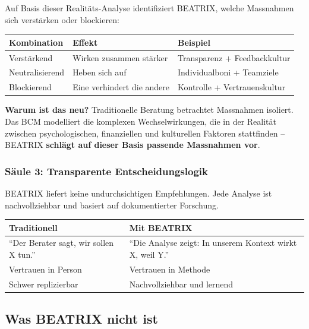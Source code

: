 \documentclass[11pt,a4paper]{article}
\begin{document}
Auf Basis dieser Realitäts-Analyse identifiziert BEATRIX, welche Massnahmen sich verstärken oder blockieren:

\begin{table}[h]
\centering
\begin{tabular}{@{}L{3cm}L{4cm}L{6cm}@{}}
\toprule
\textbf{Kombination} & \textbf{Effekt} & \textbf{Beispiel} \\
\midrule
Verstärkend & Wirken zusammen stärker & Transparenz + Feedbackkultur \\
Neutralisierend & Heben sich auf & Individualboni + Teamziele \\
Blockierend & Eine verhindert die andere & Kontrolle + Vertrauenskultur \\
\bottomrule
\end{tabular}
\end{table}

\textbf{Warum ist das neu?} Traditionelle Beratung betrachtet Massnahmen isoliert. Das BCM modelliert die komplexen Wechselwirkungen, die in der Realität zwischen psychologischen, finanziellen und kulturellen Faktoren stattfinden -- BEATRIX \textbf{schlägt auf dieser Basis passende Massnahmen vor}.

\subsubsection{Säule 3: Transparente Entscheidungslogik}

BEATRIX liefert keine undurchsichtigen Empfehlungen. Jede Analyse ist nachvollziehbar und basiert auf dokumentierter Forschung.

\begin{table}[h]
\centering
\begin{tabular}{@{}L{6cm}L{7cm}@{}}
\toprule
\textbf{Traditionell} & \textbf{Mit BEATRIX} \\
\midrule
``Der Berater sagt, wir sollen X tun.'' & ``Die Analyse zeigt: In unserem Kontext wirkt X, weil Y.'' \\
Vertrauen in Person & Vertrauen in Methode \\
Schwer replizierbar & Nachvollziehbar und lernend \\
\bottomrule
\end{tabular}
\end{table}

\subsection{Was BEATRIX nicht ist}
\end{document}

